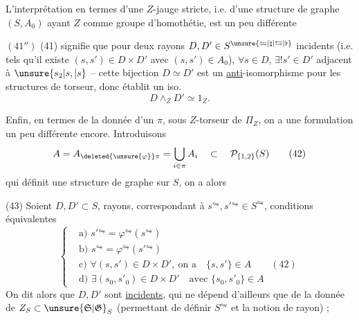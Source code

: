 L'interprétation en termes d'une  $Z$-jauge
stricte, i.e. d'une structure de graphe $(S,A_0)$ ayant
$Z$ comme groupe d'homothétie, est un peu
différente

$(41'')$ (41) signifie que pour deux rayons $D,D'\in S^{\unsure{\leftrightharpoons|\natural|\leftrightarrows|\flat}}$
incidents (i.e. tels qu'il existe $(s,s')\in D\times D'$
avec $(s,s')\in A_0$), \deleted{\unsure{$\exists$}} $\forall s\in D$, $\exists!s'\in D'$ adjacent
à $\unsure{s_2|s,|s}$ -- cette bijection $D\simeq D'$ est un \uline{anti}-isomorphisme pour les structures de torseur,
donc établit un iso.
\[
 D\wedge_ZD'\simeq 1_Z.
\]

Enfin, en termes de la donnée d'un $\pi$, sous $Z$-torseur de $\Pi_Z$, on a une formulation un peu
différente encore. Introduisons
\[
 A=A_{\deleted{\unsure{\varphi}}\pi}=\bigcup_{i\in\pi}A_i\quad\subset\quad\mathcal P_{\{1,2\}}(S)
 \tag*{(42)}
\]
qui définit une structure de graphe sur $S$, on
a alors


(43) Soient  $D,D'\subset S$,   rayons, correspondant
à $s^\leftrightharpoons,s'{}^\leftrightharpoons\in S^\leftrightharpoons$, conditions équivalentes
\[
\left\{\begin{aligned}
&\text{a) }s'{}^\leftrightharpoons=\varphi^\leftrightharpoons(s^\leftrightharpoons)\\
&\text{b) }s^\leftrightharpoons=\varphi^\leftrightharpoons(s'{}^\leftrightharpoons)\\
&\text{c) }\forall(s,s')\in D\times D',\ \text{on a}\quad\{s,s'\}\in A\qquad(42)\\
&\text{d) }\exists(s_0,s'_0)\in D\times D'\quad\text{avec }\{s_0,s'_0\}\in A
\end{aligned}\right.
\]
On dit alors que $D,D'$ sont \inserted{$\pi$-}\uline{incidents},  
qui ne dépend d'ailleurs que de la donnée de
$Z_S\subset\unsure{\mathfrak S|\mathfrak G}_S$ (permettant de définir $S^\leftrightharpoons$ et la notion de rayon) ;

